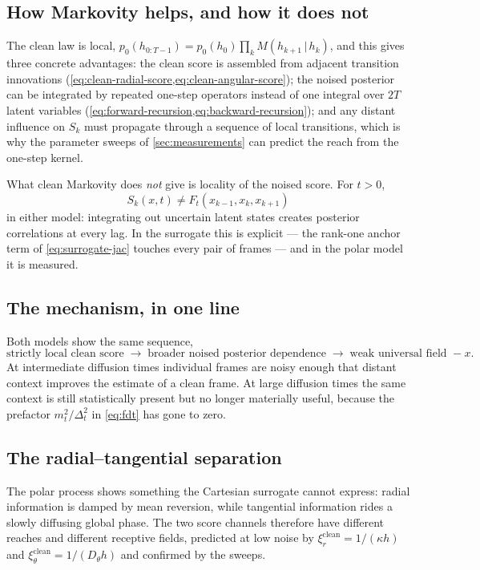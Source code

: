 \documentclass[11pt,a4paper]{article}
\newcommand{\given}{\,\vert\,}
\newcommand{\mt}{m_t}
\newcommand{\Dt}{\Delta_t}
\begin{document}
\subsection{How Markovity helps, and how it does not}

The clean law is local, $p_0(h_{0:T-1})=p_0(h_0)\prod_kM(h_{k+1}\given h_k)$, and this gives
three concrete advantages: the clean score is assembled from adjacent transition innovations
(\cref{eq:clean-radial-score,eq:clean-angular-score}); the noised posterior can be integrated
by repeated one-step operators instead of one integral over $2T$ latent variables
(\cref{eq:forward-recursion,eq:backward-recursion}); and any distant influence on $S_k$ must
propagate through a sequence of local transitions, which is why the parameter sweeps of
\cref{sec:measurements} can predict the reach from the one-step kernel.

What clean Markovity does \emph{not} give is locality of the noised score. For $t>0$,
\[
 S_k(x,t)\ne F_t(x_{k-1},x_k,x_{k+1})
\]
in either model: integrating out uncertain latent states creates posterior correlations at
every lag. In the surrogate this is explicit --- the rank-one anchor term of
\eqref{eq:surrogate-jac} touches every pair of frames --- and in the polar model it is
measured.

\subsection{The mechanism, in one line}

Both models show the same sequence,
\begin{equation}
 \text{strictly local clean score}
 \;\longrightarrow\;
 \text{broader noised posterior dependence}
 \;\longrightarrow\;
 \text{weak universal field }-x .
\end{equation}
At intermediate diffusion times individual frames are noisy enough that distant context
improves the estimate of a clean frame. At large diffusion times the same context is still
statistically present but no longer materially useful, because the prefactor
$\mt^2/\Dt^2$ in \eqref{eq:fdt} has gone to zero.

\subsection{The radial--tangential separation}

The polar process shows something the Cartesian surrogate cannot express: radial information
is damped by mean reversion, while tangential information rides a slowly diffusing global
phase. The two score channels therefore have different reaches and different receptive fields,
predicted at low noise by $\xi_r^{\mathrm{clean}}=1/(\kappa h)$ and
$\xi_\theta^{\mathrm{clean}}=1/(D_\theta h)$ and confirmed by the sweeps.
\end{document}
